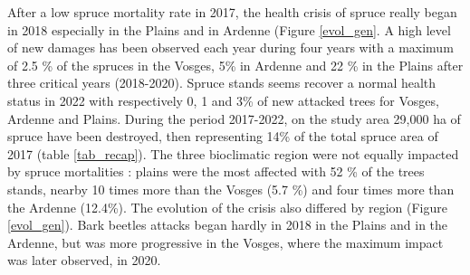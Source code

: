 \documentclass[3p,procedia]{elsarticle}
\begin{document}
After a low spruce mortality rate in 2017, the health crisis of spruce really began in 2018 especially in the Plains and in Ardenne (Figure \ref{evol_gen}.
A high level of new damages has been observed each year during four years with a maximum of 2.5 \% of the spruces in the Vosges, 5\% in Ardenne and 22 \% in the Plains after three critical years (2018-2020).
Spruce stands seems recover a normal health status in 2022 with respectively 0, 1 and 3\% of new attacked trees for Vosges, Ardenne and Plains.
During the period 2017-2022, on the study area 29,000 ha of spruce have been destroyed, then representing 14\%  of the total spruce area of 2017 (table \ref{tab_recap}).
The three bioclimatic region were not equally impacted by spruce mortalities : 
plains were the most affected with 52 \% of the trees stands,  nearby 10 times more than the Vosges (5.7 \%) and four times more than the Ardenne (12.4\%).
The evolution of the crisis also differed by region (Figure \ref{evol_gen}).
Bark beetles attacks began hardly in 2018 in the Plains and in the Ardenne, but was more progressive in the Vosges, where the maximum impact was later observed, in 2020.
\end{document}
